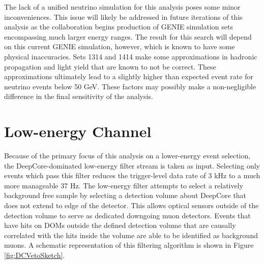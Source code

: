 \documentclass{gatech-thesis}
\begin{document}
The lack of a unified neutrino simulation for this analysis poses some minor inconveniences. This issue will likely be addressed in future iterations of this analysis as the collaboration begins production of GENIE simulation sets encompassing much larger energy ranges. The result for this search will depend on this current GENIE simulation, however,  which is known to have some physical inaccuracies. Sets 1314 and 1414 make some approximations in hadronic propagation and light yield that are known to not be correct. These approximations ultimately lead to a slightly higher than expected event rate for neutrino events below 50 GeV. These factors may possibly make a non-negligible difference in the final sensitivity of the analysis.

\section{Low-energy Channel}

Because of the primary focus of this analysis on a lower-energy event selection, the DeepCore-dominated low-energy filter stream is taken as input. Selecting only events which pass this filter reduces the trigger-level data rate of 3 kHz to a much more manageable 37 Hz. The low-energy filter attempts to select a relatively background free sample by selecting a detection volume about DeepCore that does not extend to edge of the detector. This allows optical sensors outside of the detection volume to serve as dedicated downgoing muon detectors. Events that have hits on DOMs outside the defined detection volume that are causally correlated with the hits inside the volume are able to be identified as background muons. A schematic representation of this filtering algorithm is shown in Figure \ref{fig:DCVetoSketch}. 
\end{document}
